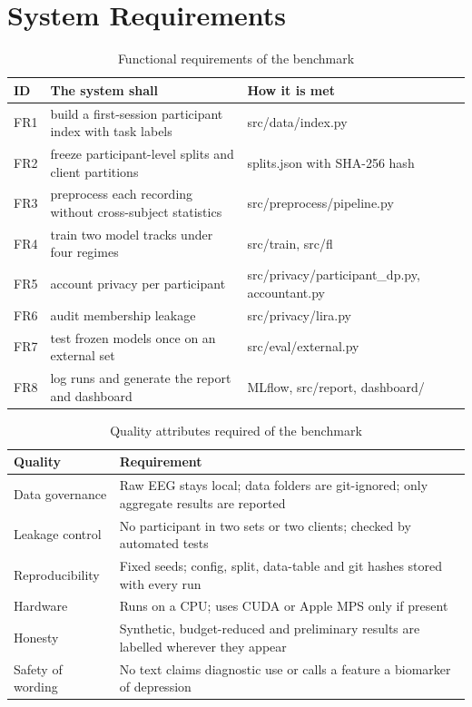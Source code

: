 \documentclass[12pt,a4paper,oneside]{report}
\begin{document}
\section{System Requirements}
\begin{table}[!htbp]\centering\small{}
\caption{Functional requirements of the benchmark}\label{tab:fr}
\begin{tabularx}{\textwidth}{llX}
\toprule
ID & The system shall & How it is met\\
\midrule
FR1 & build a first-session participant index with task labels & src/data/index.py\\
FR2 & freeze participant-level splits and client partitions & splits.json with SHA-256 hash\\
FR3 & preprocess each recording without cross-subject statistics & src/preprocess/pipeline.py\\
FR4 & train two model tracks under four regimes & src/train, src/fl\\
FR5 & account privacy per participant & src/privacy/participant\_dp.py, accountant.py\\
FR6 & audit membership leakage & src/privacy/lira.py\\
FR7 & test frozen models once on an external set & src/eval/external.py\\
FR8 & log runs and generate the report and dashboard & MLflow, src/report, dashboard/\\
\bottomrule
\end{tabularx}
\end{table}
\begin{table}[!htbp]\centering\small{}
\caption{Quality attributes required of the benchmark}\label{tab:nfr}
\begin{tabularx}{\textwidth}{lX}
\toprule
Quality & Requirement\\
\midrule
Data governance & Raw EEG stays local; data folders are git-ignored; only aggregate results are reported\\
Leakage control & No participant in two sets or two clients; checked by automated tests\\
Reproducibility & Fixed seeds; config, split, data-table and git hashes stored with every run\\
Hardware & Runs on a CPU; uses CUDA or Apple MPS only if present\\
Honesty & Synthetic, budget-reduced and preliminary results are labelled wherever they appear\\
Safety of wording & No text claims diagnostic use or calls a feature a biomarker of depression\\
\bottomrule
\end{tabularx}
\end{table}
\end{document}
